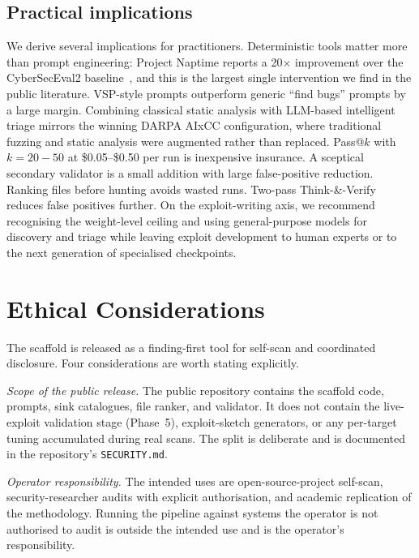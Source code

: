 \documentclass[11pt,a4paper]{article}
\begin{document}
\subsection{Practical implications}

We derive several implications for practitioners. Deterministic tools
matter more than prompt engineering: Project Naptime reports a 20$\times$
improvement over the CyberSecEval2
baseline~\citep{projectzeroNaptime2024}, and this is the largest single
intervention we find in the public literature. VSP-style prompts
outperform generic ``find bugs'' prompts by a large margin. Combining
classical static analysis with LLM-based intelligent triage mirrors the
winning DARPA AIxCC configuration, where traditional fuzzing and static
analysis were augmented rather than replaced. Pass@$k$ with $k{=}20{-}50$
at \$0.05--\$0.50 per run is inexpensive insurance. A sceptical
secondary validator is a small addition with large false-positive
reduction. Ranking files before hunting avoids wasted runs. Two-pass
Think-\&-Verify reduces false positives further. On the exploit-writing
axis, we recommend recognising the weight-level ceiling and using
general-purpose models for discovery and triage while leaving exploit
development to human experts or to the next generation of specialised
checkpoints.

\section{Ethical Considerations}
\label{sec:ethics}

The scaffold is released as a finding-first tool for self-scan and
coordinated disclosure. Four considerations are worth stating explicitly.

\textit{Scope of the public release.} The public repository contains the
scaffold code, prompts, sink catalogues, file ranker, and validator. It
does not contain the live-exploit validation stage (Phase~5), exploit-sketch
generators, or any per-target tuning accumulated during real scans. The
split is deliberate and is documented in the repository's
\texttt{SECURITY.md}.

\textit{Operator responsibility.} The intended uses are open-source-project
self-scan, security-researcher audits with explicit authorisation, and
academic replication of the methodology. Running the pipeline against
systems the operator is not authorised to audit is outside the intended
use and is the operator's responsibility.
\end{document}
